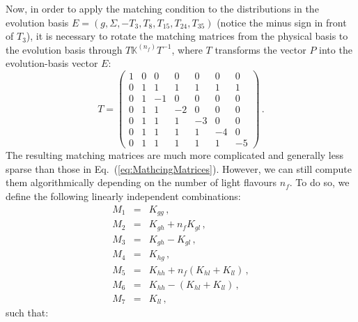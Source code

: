 \documentclass[10pt,a4paper]{article}
\begin{document}
Now, in order to apply the matching condition to the distributions in
the evolution basis $E=(g,\Sigma,-T_3,T_8,T_{15},T_{24},T_{35})$
(notice the minus sign in front of $T_3$), it is necessary to rotate
the matching matrices from the physical basis to the evolution basis
through $T\mathbb{K}^{(n_f)}T^{-1}$, where $T$ transforms the vector
$P$ into the evolution-basis vector $E$:
\begin{equation}
T = 
\begin{pmatrix}
1 & 0 & 0  & 0  & 0  & 0  & 0 \\
0 & 1 & 1  & 1  & 1  & 1  & 1 \\
0 & 1 & -1  & 0  & 0  & 0  & 0 \\
0 & 1 & 1  & -2  & 0  & 0  & 0 \\
0 & 1 & 1  & 1  & -3  & 0  & 0 \\
0 & 1 & 1  & 1  & 1  & -4  & 0 \\
0 & 1 & 1  & 1  & 1  & 1  & -5
\end{pmatrix}\,.
\label{eq:RotationMatrix}
\end{equation}
The resulting matching matrices are much more complicated and
generally less sparse than those in
Eq.~(\ref{eq:MathcingMatrices}). However, we can still compute them
algorithmically depending on the number of light flavours $n_f$. To do
so, we define the following linearly independent combinations:
\begin{equation}
\begin{array}{lcl}
M_1 &=& K_{gg}\,,\\
M_2 &=& K_{gh} + n_f K_{gl}\,,\\
M_3 &=& K_{gh}-K_{gl}\,,\\
M_4 &=& K_{hg}\,,\\
M_5 &=& K_{hh}+n_f(K_{hl}+K_{ll}) \,,\\
M_6 &=& K_{hh}-(K_{hl}+K_{ll})\,,\\
M_7 &=& K_{ll}\,,
\end{array}
\label{eq:Mcombs}
\end{equation}
such that:
\end{document}
